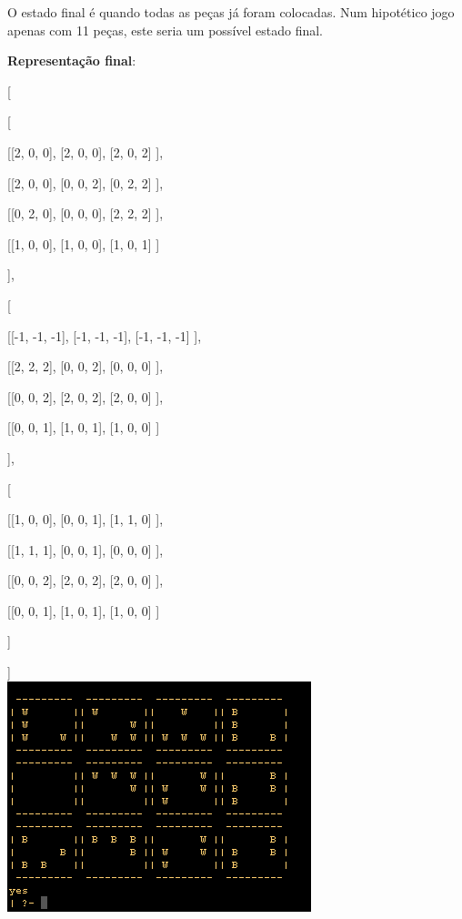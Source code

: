 \documentclass[a4paper]{article}
\begin{document}
O estado final é quando todas as peças já foram colocadas. Num hipotético jogo apenas com 11 peças, este seria um possível estado final.

\textbf{Representação final}:

[


		[

		 [[2, 0, 0],
		  [2, 0, 0],
		  [2, 0, 2]
		 ],

		 [[2, 0, 0],
		  [0, 0, 2],
		  [0, 2, 2]
		 ],

		 [[0, 2, 0],
		  [0, 0, 0],
		  [2, 2, 2]
		 ],

		 [[1, 0, 0],
		  [1, 0, 0],
		  [1, 0, 1]
		 ]

		],



		[

		 [[-1, -1, -1],
		  [-1, -1, -1],
		  [-1, -1, -1]
		 ],

		 [[2, 2, 2],
		  [0, 0, 2],
		  [0, 0, 0]
		 ],

		 [[0, 0, 2],
		  [2, 0, 2],
		  [2, 0, 0]
		 ],

		 [[0, 0, 1],
		  [1, 0, 1],
		  [1, 0, 0]
		 ]

		],


		[

		 [[1, 0, 0],
		  [0, 0, 1],
		  [1, 1, 0]
		 ],

		 [[1, 1, 1],
		  [0, 0, 1],
		  [0, 0, 0]
		 ],

		 [[0, 0, 2],
		  [2, 0, 2],
		  [2, 0, 0]
		 ],

		 [[0, 0, 1],
		  [1, 0, 1],
		  [1, 0, 0]
		 ]

		]

	]\linebreak\linebreak\\

\includegraphics[scale=0.6]{../printscreens/winning_board.png} \linebreak
\end{document}
